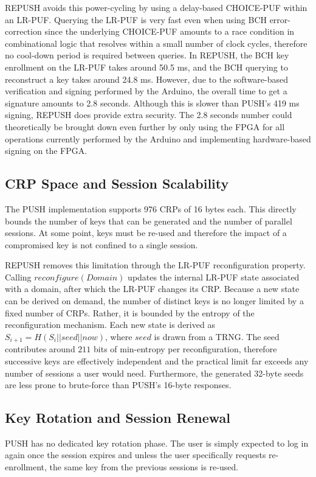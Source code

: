 REPUSH avoids this power-cycling by using a delay-based CHOICE-PUF within an LR-PUF. Querying the LR-PUF is very fast even when using BCH error-correction since the underlying CHOICE-PUF amounts to a race condition in combinational logic that resolves within a small number of clock cycles, therefore no cool-down period is required between queries. In REPUSH, the BCH key enrollment on the LR-PUF takes around 50.5 ms, and the BCH querying to reconstruct a key takes around 24.8 ms. However, due to the software-based verification and signing performed by the Arduino, the overall time to get a signature amounts to 2.8 seconds. Although this is slower than PUSH's 419 ms signing, REPUSH does provide extra security.  The 2.8 seconds number could theoretically be brought down even further by only using the FPGA for all operations currently performed by the Arduino and implementing hardware-based signing on the FPGA.

\subsection{CRP Space and Session Scalability}
The PUSH implementation supports 976 CRPs of 16 bytes each. This directly bounds the number of keys that can be generated and the number of parallel sessions. At some point, keys must be re-used and therefore the impact of a compromised key is not confined to a single session.

REPUSH removes this limitation through the LR-PUF reconfiguration property. Calling $reconfigure(Domain)$ updates the internal LR-PUF state associated with a domain, after which the LR-PUF changes its CRP. Because a new state can be derived on demand, the number of distinct keys is no longer limited by a fixed number of CRPs. Rather, it is bounded by the entropy of the reconfiguration mechanism. Each new state is derived as $S_{i+1}=H(S_i||seed||now)$, where $seed$ is drawn from a TRNG. The seed contributes around $211$ bits of min-entropy per reconfiguration, therefore successive keys are effectively independent and the practical limit far exceeds any number of sessions a user would need. Furthermore, the generated 32-byte seeds are less prone to brute-force than PUSH's 16-byte responses.

\subsection{Key Rotation and Session Renewal}
PUSH has no dedicated key rotation phase. The user is simply expected to log in again once the session expires and unless the user specifically requests re-enrollment, the same key from the previous sessions is re-used.

